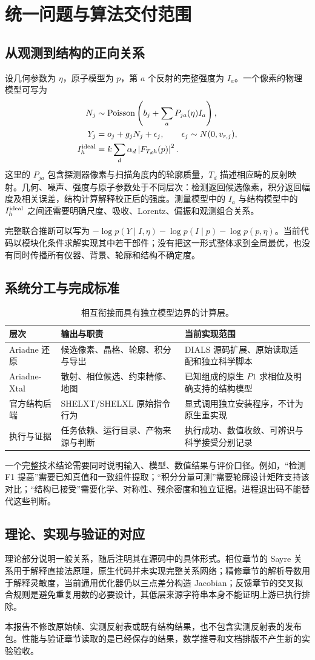 \chapter{统一问题与算法交付范围}
\section{从观测到结构的正向关系}
设几何参数为 $\eta$，原子模型为 $p$，第 $a$ 个反射的完整强度为 $I_a$。一个像素的物理模型可写为
\begin{align}
N_j&\sim\mathrm{Poisson}\left(b_j+\sum_a P_{ja}(\eta)I_a\right),\\
Y_j&=o_j+g_jN_j+\epsilon_j,\qquad \epsilon_j\sim N(0,v_{r,j}),\\
I_h^{\rm ideal}&=k\sum_d\alpha_d\left|F_{T_dh}(p)\right|^2.
\end{align}
这里的 $P_{ja}$ 包含探测器像素与扫描角度内的轮廓质量，$T_d$ 描述相应畴的反射映射。几何、噪声、强度与原子参数处于不同层次：检测返回候选像素，积分返回幅度及相关误差，结构计算解释校正后的强度。测量模型中的 $I_a$ 与结构模型中的 $I_h^{\rm ideal}$ 之间还需要明确尺度、吸收、Lorentz、偏振和观测组合关系。

完整联合推断可以写为 $-\log p(Y\mid I,\eta)-\log p(I\mid p)-\log p(p,\eta)$。当前代码以模块化条件求解实现其中若干部件；没有把这一形式整体求到全局最优，也没有同时传播所有仪器、背景、轮廓和结构不确定度。
\section{系统分工与完成标准}
\begin{table}[htbp]\centering\small
\begin{tabularx}{\textwidth}{p{25mm}XX}
\toprule 层次 & 输出与职责 & 当前实现范围\\\midrule
Ariadne 还原 & 候选像素、晶格、轮廓、积分与导出 & DIALS 源码扩展、原始读取适配和独立科学脚本\\
Ariadne-Xtal & 散射、相位候选、约束精修、地图 & 已知组成的原生 $P1$ 求相位及明确支持的结构模型\\
官方结构后端 & SHELXT/SHELXL 原始指令行为 & 显式调用独立安装程序，不计为原生重实现\\
执行与证据 & 任务依赖、运行目录、产物来源与判断 & 执行成功、数值收敛、可辨识与科学接受分别记录\\
\bottomrule
\end{tabularx}
\caption{相互衔接而具有独立模型边界的计算层。}
\end{table}
一个完整技术结论需要同时说明输入、模型、数值结果与评价口径。例如，“检测 F1 提高”需要已知真值和一致组件提取；“积分分量可测”需要轮廓设计矩阵支持该对比；“结构已接受”需要化学、对称性、残余密度和独立证据。进程退出码不能替代这些判断。
\section{理论、实现与验证的对应}
理论部分说明一般关系，随后注明其在源码中的具体形式。相位章节的 Sayre 关系用于解释直接法原理，原生代码并未实现完整关系网络；精修章节的解析导数用于解释灵敏度，当前通用优化器仍以三点差分构造 Jacobian；反馈章节的交叉拟合规则是避免重复用数的必要设计，其低层来源字符串本身不能证明上游已执行排除。

本报告不修改原始帧、实测反射表或既有结构结果，也不包含实测反射表的发布包。性能与验证章节读取的是已经保存的结果，数学推导和文档排版不产生新的实验验收。
